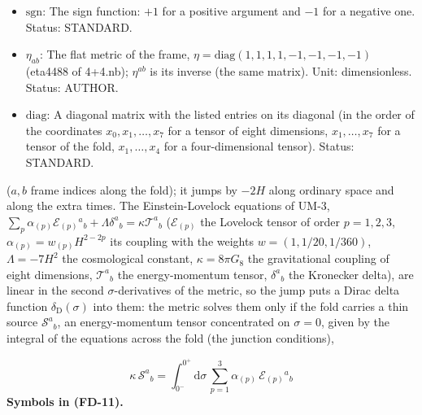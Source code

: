 \documentclass[
  10pt,
]{article}
\begin{document}
\begin{itemize}
  \(H\): The author's constant (an inverse length) that fixes the period
  \(\pi/(6H)\) of \(x_0\), the Lovelock couplings
  \(\alpha_{(p)} = w_{(p)}H^{2-2p}\) and the cosmological constant
  \(\Lambda = -7H^2\) (the author's original value \(-10H^2\) was
  corrected on 2026-10-25); in UM-3 a free parameter. Unit: GeV
  (1/length). Status: AUTHOR.
\item
  \(\mathrm{sgn}\): The sign function: \(+1\) for a positive argument
  and \(-1\) for a negative one. Status: STANDARD.
\item
  \(\eta_{ab}\): The flat metric of the frame,
  \(\eta = \mathrm{diag}(1, 1, 1, 1, -1, -1, -1, -1)\) (eta4488 of
  4+4.nb); \(\eta^{ab}\) is its inverse (the same matrix). Unit:
  dimensionless. Status: AUTHOR.
\item
  \(\mathrm{diag}\): A diagonal matrix with the listed entries on its
  diagonal (in the order of the coordinates \(x_0, x_1, \dots, x_7\) for
  a tensor of eight dimensions, \(x_1, \dots, x_7\) for a tensor of the
  fold, \(x_1, \dots, x_4\) for a four-dimensional tensor). Status:
  STANDARD.
\end{itemize}

(\(a, b\) frame indices along the fold); it jumps by \(-2H\) along
ordinary space and along the extra times. The Einstein-Lovelock
equations of UM-3,
\(\sum_p\alpha_{(p)}\mathcal{E}_{(p)}{}^a{}_b + \Lambda\delta^a{}_b = \kappa\mathcal{T}^a{}_b\)
(\(\mathcal{E}_{(p)}\) the Lovelock tensor of order \(p = 1, 2, 3\),
\(\alpha_{(p)} = w_{(p)}H^{2-2p}\) its coupling with the weights
\(w = (1, 1/20, 1/360)\), \(\Lambda = -7H^2\) the cosmological constant,
\(\kappa = 8\pi G_8\) the gravitational coupling of eight dimensions,
\(\mathcal{T}^a{}_b\) the energy-momentum tensor, \(\delta^a{}_b\) the
Kronecker delta), are linear in the second \(\sigma\)-derivatives of the
metric, so the jump puts a Dirac delta function
\(\delta_{\mathrm{D}}(\sigma)\) into them: the metric solves them only
if the fold carries a thin source \(\mathcal{S}^a{}_b\), an
energy-momentum tensor concentrated on \(\sigma = 0\), given by the
integral of the equations across the fold (the junction conditions),

\[
\kappa\,\mathcal{S}^a{}_b = \int_{0^-}^{0^+}\mathrm{d}\sigma\,\sum_{p=1}^{3}\alpha_{(p)}\,\mathcal{E}_{(p)}{}^a{}_b \tag{FD-11}
\] \textbf{Symbols in (FD-11).}
\end{document}
